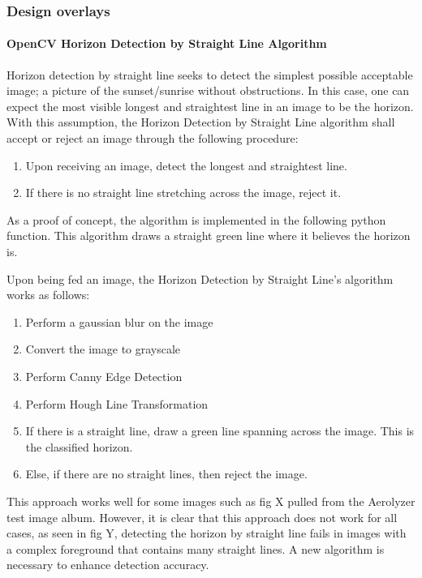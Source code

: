 \documentclass[onecolumn, draftclsnofoot,10pt, compsoc]{IEEEtran}
\begin{document}
\begin{singlespace}
      \subsubsection{Design overlays}
      		\paragraph{OpenCV Horizon Detection by Straight Line Algorithm}
      			Horizon detection by straight line seeks to detect the simplest possible acceptable image; a picture of the sunset/sunrise without obstructions. In this case, one can expect the most visible longest and straightest line in an image to be the horizon. With this assumption, the Horizon Detection by Straight Line algorithm shall accept or reject an image through the following procedure:
      			\begin{enumerate}
      				\item Upon receiving an image, detect the longest and straightest line.
      				\item If there is no straight line stretching across the image, reject it.
      			\end{enumerate}
      			As a proof of concept, the algorithm is implemented in the following python function. This algorithm draws a straight green line where it believes the horizon is.
      			
     			
     			Upon being fed an image, the Horizon Detection by Straight Line’s algorithm works as follows:
				

				\begin{enumerate}
					\item Perform a gaussian blur on the image
					\item Convert the image to grayscale
					\item Perform Canny Edge Detection \cite{svm}
					\item Perform Hough Line Transformation \cite{svm}
					\item If there is a straight line, draw a green line spanning across the image. This is the classified horizon.
					\item Else, if there are no straight lines, then reject the image.
				\end{enumerate}


				This approach works well for some images such as fig X pulled from the Aerolyzer test image album. However, it is clear that this approach does not work for all cases, as seen in fig Y, detecting the horizon by straight line fails in images with a complex foreground that contains many straight lines. A new algorithm is necessary to enhance detection accuracy.\\


\end{singlespace}
\end{document}
